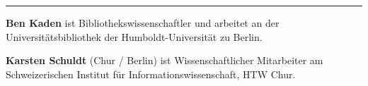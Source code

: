 \begin{center}\rule{0.5\linewidth}{\linethickness}\end{center}

\textbf{Ben Kaden} ist Bibliothekswissenschaftler und arbeitet an der
Universitätsbibliothek der Humboldt-Universität zu Berlin.

\textbf{Karsten Schuldt} (Chur / Berlin) ist Wissenschaftlicher
Mitarbeiter am Schweizerischen Institut für Informationswissenschaft,
HTW Chur.

